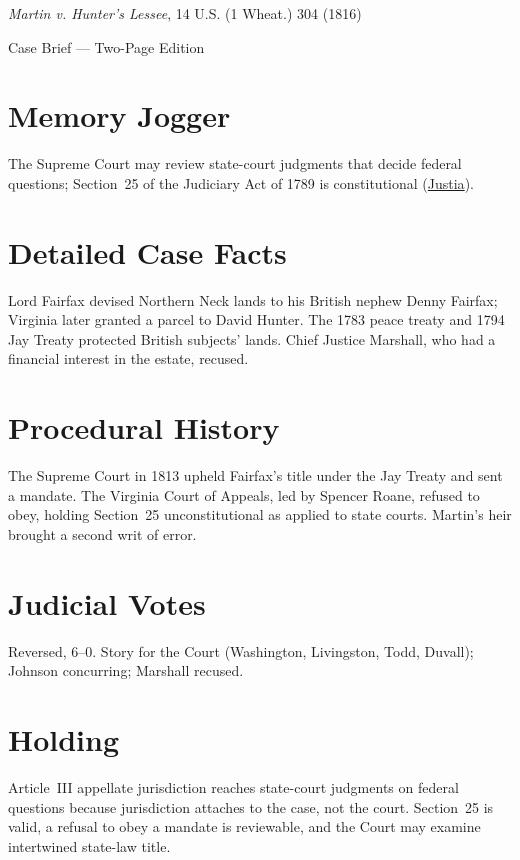 \documentclass[12pt]{article}
\begin{document}
\begin{center}
{\LARGE \textit{Martin v. Hunter's Lessee}, 14 U.S. (1 Wheat.) 304 (1816)\par}
\vspace{0.5em}
{\large Case Brief --- Two-Page Edition\par}
\end{center}

\section{Memory Jogger}
The Supreme Court may review state-court judgments that decide federal questions; Section~25 of the Judiciary Act of 1789 is constitutional (\href{https://supreme.justia.com/cases/federal/us/14/304/}{Justia}).

\section{Detailed Case Facts}
Lord Fairfax devised Northern Neck lands to his British nephew Denny Fairfax; Virginia later granted a parcel to David Hunter. The 1783 peace treaty and 1794 Jay Treaty protected British subjects' lands. Chief Justice Marshall, who had a financial interest in the estate, recused.

\section{Procedural History}
The Supreme Court in 1813 upheld Fairfax's title under the Jay Treaty and sent a mandate. The Virginia Court of Appeals, led by Spencer Roane, refused to obey, holding Section~25 unconstitutional as applied to state courts. Martin's heir brought a second writ of error.

\section{Judicial Votes}
Reversed, 6--0. Story for the Court (Washington, Livingston, Todd, Duvall); Johnson concurring; Marshall recused.

\section{Holding}
Article~III appellate jurisdiction reaches state-court judgments on federal questions because jurisdiction attaches to the case, not the court. Section~25 is valid, a refusal to obey a mandate is reviewable, and the Court may examine intertwined state-law title.
\end{document}
